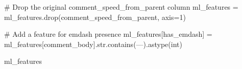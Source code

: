 \documentclass[
  12pt,
  letterpaper,
  DIV=11,
  numbers=noendperiod]{scrartcl}
\newenvironment{Shaded}{\begin{snugshade}}{\end{snugshade}}
\newcommand{\BuiltInTok}[1]{\textcolor[rgb]{0.00,0.23,0.31}{#1}}
\newcommand{\CommentTok}[1]{\textcolor[rgb]{0.37,0.37,0.37}{#1}}
\newcommand{\DecValTok}[1]{\textcolor[rgb]{0.68,0.00,0.00}{#1}}
\newcommand{\NormalTok}[1]{\textcolor[rgb]{0.00,0.23,0.31}{#1}}
\newcommand{\OperatorTok}[1]{\textcolor[rgb]{0.37,0.37,0.37}{#1}}
\newcommand{\StringTok}[1]{\textcolor[rgb]{0.13,0.47,0.30}{#1}}
\begin{document}
\begin{Shaded}
\begin{Highlighting}[]
\CommentTok{\# Drop the original \textquotesingle{}comment\_speed\_from\_parent\textquotesingle{} column}
\NormalTok{ml\_features }\OperatorTok{=}\NormalTok{ ml\_features.drop(}\StringTok{\textquotesingle{}comment\_speed\_from\_parent\textquotesingle{}}\NormalTok{, axis}\OperatorTok{=}\DecValTok{1}\NormalTok{)}

\CommentTok{\# Add a feature for emdash presence}
\NormalTok{ml\_features[}\StringTok{\textquotesingle{}has\_emdash\textquotesingle{}}\NormalTok{] }\OperatorTok{=}\NormalTok{ ml\_features[}\StringTok{\textquotesingle{}comment\_body\textquotesingle{}}\NormalTok{].}\BuiltInTok{str}\NormalTok{.contains(}\StringTok{\textquotesingle{}—\textquotesingle{}}\NormalTok{).astype(}\BuiltInTok{int}\NormalTok{)}

\NormalTok{ml\_features}
\end{Highlighting}
\end{Shaded}
\end{document}
